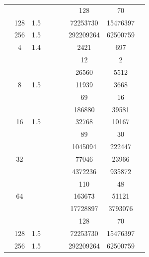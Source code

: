 \begin{table}[htbp]
\begin{tabular}{l S[table-format=3.0] S[table-format=4.1] l S[table-format=6.0] S[table-format=6.0] S[table-format=6.0] S[table-format=5.0] S[table-format=2.0]}
     &  &  &  & {\text{---}} & {\text{---}} & 128 & 70 & {\text{---}} \\
     & 128 & 1.5 &  & {\text{---}} & {\text{---}} & 72253730 & 15476397 & {\text{---}} \\
     & 256 & 1.5 &  & {\text{---}} & {\text{---}} & 292209264 & 62500759 & {\text{---}} \\
    \midrule
     & 4 & 1.4 &  & {\text{---}} & {\text{---}} & 2421 & 697 & {\text{---}} \\
     &  &  &  & {\text{---}} & {\text{---}} & 12 & 2 & {\text{---}} \\
     &  &  &  & {\text{---}} & {\text{---}} & 26560 & 5512 & {\text{---}} \\
     & 8 & 1.5 &  & {\text{---}} & {\text{---}} & 11939 & 3668 & {\text{---}} \\
     &  &  &  & {\text{---}} & {\text{---}} & 69 & 16 & {\text{---}} \\
     &  &  &  & {\text{---}} & {\text{---}} & 186880 & 39581 & {\text{---}} \\
     & 16 & 1.5 &  & {\text{---}} & {\text{---}} & 32768 & 10167 & {\text{---}} \\
     &  &  &  & {\text{---}} & {\text{---}} & 89 & 30 & {\text{---}} \\
     &  &  &  & {\text{---}} & {\text{---}} & 1045094 & 222447 & {\text{---}} \\
     & 32 & {\text{---}} &  & {\text{---}} & {\text{---}} & 77046 & 23966 & {\text{---}} \\
     &  &  &  & {\text{---}} & {\text{---}} & 4372236 & 935872 & {\text{---}} \\
     &  &  &  & {\text{---}} & {\text{---}} & 110 & 48 & {\text{---}} \\
     & 64 & {\text{---}} &  & {\text{---}} & {\text{---}} & 163673 & 51121 & {\text{---}} \\
     &  &  &  & {\text{---}} & {\text{---}} & 17728897 & 3793076 & {\text{---}} \\
     &  &  &  & {\text{---}} & {\text{---}} & 128 & 70 & {\text{---}} \\
     & 128 & 1.5 &  & {\text{---}} & {\text{---}} & 72253730 & 15476397 & {\text{---}} \\
     & 256 & 1.5 &  & {\text{---}} & {\text{---}} & 292209264 & 62500759 & {\text{---}} \\

\end{tabular}
\end{table}
